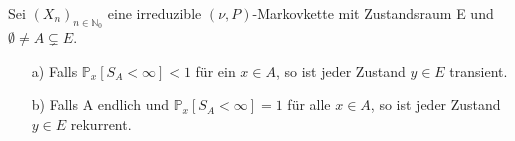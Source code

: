 \label{Px[SA < unendlich] < 1, so y transient}
Sei $(X_{n})_{n \in \mathbb{N}_{0}}$ eine irreduzible $(\nu,P)$-Markovkette mit Zustandsraum E und $\emptyset \neq A \subsetneq E$.
\begin{itemize}
\item[a)] Falls $\mathbb{P}_{x}[S_{A} < \infty]<1$ für ein $x \in A$, so ist jeder Zustand $y \in E$ transient.
\item[b)] Falls A endlich und $\mathbb{P}_{x}[S_{A}<\infty]=1$ für alle $x \in A$, so ist jeder Zustand $y \in E$ rekurrent.  
\end{itemize}